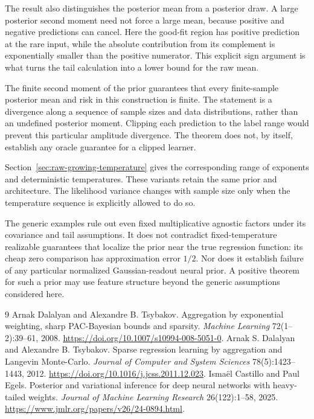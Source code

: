 \documentclass[11pt]{article}
\begin{document}
The result also distinguishes the posterior mean from a posterior
draw. A large posterior second moment need not force a large mean,
because positive and negative predictions can cancel. Here the
good-fit region has positive prediction at the rare input, while the
absolute contribution from its complement is exponentially smaller
than the positive numerator. This explicit sign argument is what
turns the tail calculation into a lower bound for the raw mean.

The finite second moment of the prior guarantees that every
finite-sample posterior mean and risk in this construction is finite.
The statement is a divergence along a sequence of sample sizes and
data distributions, rather than an undefined posterior moment.
Clipping each prediction to the label range would prevent this
particular amplitude divergence. The theorem does not, by itself,
establish any oracle guarantee for a clipped learner.

Section~\ref{sec:raw-growing-temperature} gives the corresponding
range of exponents and deterministic temperatures. These variants
retain the same prior and architecture. The likelihood variance
changes with sample size only when the temperature sequence is
explicitly allowed to do so.

The generic examples rule out even fixed multiplicative agnostic
factors under its covariance and tail assumptions. It does not
contradict fixed-temperature realizable guarantees that localize the
prior near the true regression function: its cheap zero comparison
has approximation error $1/2$. Nor does it establish failure of any
particular normalized Gaussian-readout neural prior. A positive
theorem for such a prior may use feature structure beyond the
generic assumptions considered here.

\appendix



\begin{thebibliography}{9}
 Arnak Dalalyan and Alexandre B. Tsybakov.
Aggregation by exponential weighting, sharp PAC-Bayesian bounds and sparsity.
\emph{Machine Learning} 72(1--2):39--61, 2008.
\url{https://doi.org/10.1007/s10994-008-5051-0}.
 Arnak S. Dalalyan and Alexandre B. Tsybakov.
Sparse regression learning by aggregation and Langevin Monte-Carlo.
\emph{Journal of Computer and System Sciences} 78(5):1423--1443, 2012.
\url{https://doi.org/10.1016/j.jcss.2011.12.023}.
 Isma\"el Castillo and Paul Egels.
Posterior and variational inference for deep neural networks with heavy-tailed weights.
\emph{Journal of Machine Learning Research} 26(122):1--58, 2025.
\url{https://www.jmlr.org/papers/v26/24-0894.html}.
\end{thebibliography}
\end{document}
